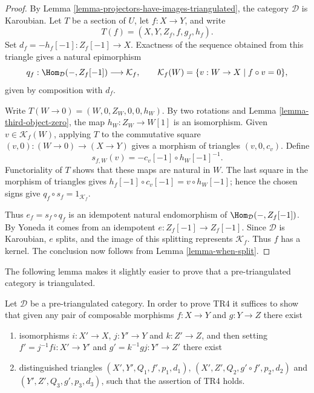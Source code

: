 \begin{proof}
By Lemma \ref{lemma-projectors-have-images-triangulated}, the category
$\mathcal{D}$ is Karoubian. Let $T$ be a section of $U$, let $f : X \to Y$,
and write
$$
T(f) = (X, Y, Z_f, f, g_f, h_f).
$$
Set $d_f = -h_f[-1] : Z_f[-1] \to X$. Exactness of the sequence obtained from
this triangle gives a natural epimorphism
$$
q_f : \Hom_\mathcal{D}(-, Z_f[-1]) \longrightarrow \mathcal{K}_f,
\qquad
\mathcal{K}_f(W) = \{v : W \to X \mid f \circ v = 0\},
$$
given by composition with $d_f$.

Write $T(W \to 0) = (W, 0, Z_W, 0, 0, h_W)$. By two rotations and
Lemma \ref{lemma-third-object-zero}, the map $h_W : Z_W \to W[1]$ is an
isomorphism. Given $v \in \mathcal{K}_f(W)$, applying $T$ to the commutative
square $(v, 0) : (W \to 0) \to (X \to Y)$ gives a morphism of triangles
$(v, 0, c_v)$. Define
$$
s_{f,W}(v) = -c_v[-1] \circ h_W[-1]^{-1}.
$$
Functoriality of $T$ shows that these maps are natural in $W$. The last square
in the morphism of triangles gives
$h_f[-1] \circ c_v[-1] = v \circ h_W[-1]$; hence the chosen signs give
$q_f \circ s_f = 1_{\mathcal{K}_f}$.

Thus $e_f = s_f \circ q_f$ is an idempotent natural endomorphism of
$\Hom_\mathcal{D}(-, Z_f[-1])$. By Yoneda it comes from an idempotent
$e : Z_f[-1] \to Z_f[-1]$. Since $\mathcal{D}$ is Karoubian, $e$ splits, and
the image of this splitting represents $\mathcal{K}_f$. Thus $f$ has a kernel.
The conclusion now follows from Lemma \ref{lemma-when-split}.
\end{proof}

\noindent
The following lemma makes it slightly easier to prove that a
pre-triangulated category is triangulated.

\begin{lemma}
\label{lemma-easier-axiom-four}
Let $\mathcal{D}$ be a pre-triangulated category.
In order to prove TR4 it suffices to show that given
any pair of composable morphisms
$f : X \to Y$ and $g : Y \to Z$ there exist
\begin{enumerate}
\item isomorphisms $i : X' \to X$, $j : Y' \to Y$ and
$k : Z' \to Z$, and then setting $f' = j^{-1}fi : X' \to Y'$ and
$g' = k^{-1}gj : Y' \to Z'$ there exist
\item distinguished triangles
$(X', Y', Q_1, f', p_1, d_1)$,
$(X', Z', Q_2, g' \circ f', p_2, d_2)$
and
$(Y', Z', Q_3, g', p_3, d_3)$,
such that the assertion of TR4 holds.
\end{enumerate}
\end{lemma}

